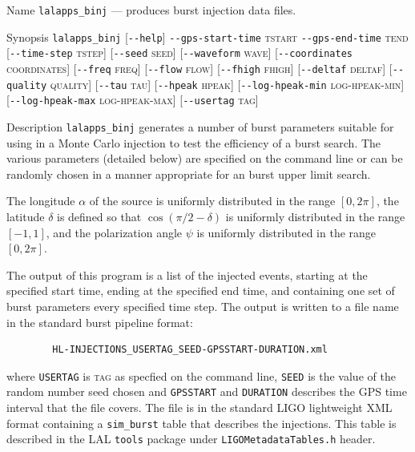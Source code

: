 \begin{entry}
\item[Name]
\verb$lalapps_binj$ --- produces burst injection data files.

\item[Synopsis]
\verb$lalapps_binj$ 
[\verb$--help$]
\verb$--gps-start-time$ \textsc{tstart} 
\verb$--gps-end-time$ \textsc{tend} 
[\verb$--time-step$ \textsc{tstep}]
[\verb$--seed$ \textsc{seed}]
[\verb$--waveform$ \textsc{wave}]
[\verb$--coordinates$ \textsc{coordinates}]
[\verb$--freq$ \textsc{freq}]
[\verb$--flow$ \textsc{flow}]
[\verb$--fhigh$ \textsc{fhigh}]
[\verb$--deltaf$ \textsc{deltaf}]
[\verb$--quality$ \textsc{quality}]
[\verb$--tau$ \textsc{tau}]
[\verb$--hpeak$ \textsc{hpeak}]
[\verb$--log-hpeak-min$ \textsc{log-hpeak-min}]
[\verb$--log-hpeak-max$ \textsc{log-hpeak-max}]
[\verb$--usertag$ \textsc{tag}]

\item[Description] 
\verb$lalapps_binj$
generates a number of burst  parameters suitable  for using in a Monte
Carlo injection to test the efficiency of a burst search.  The  various
parameters (detailed  below)  are specified on the command line or can be
randomly chosen in a manner appropriate for an burst upper limit
search.

The longitude $\alpha$ of the source is uniformly distributed in the
range $[0,2\pi]$, the latitude $\delta$ is defined so that $\cos(\pi/2 - 
\delta)$ is uniformly distributed in the range $[-1,1]$,  and the 
polarization angle $\psi$  is uniformly distributed in the
range $[0,2\pi]$.

The output of this program  is  a  list  of  the  injected events,  starting
at  the specified start time, ending at the specified end time, and containing
one set  of burst parameters every specified time step.  The output
is written to a file name in the standard burst pipeline format:
\begin{center}
\begin{verbatim}
        HL-INJECTIONS_USERTAG_SEED-GPSSTART-DURATION.xml
\end{verbatim}
\end{center}
where \verb$USERTAG$ is \textsc{tag} as specfied on the command line, 
\verb$SEED$ is the  value  of  the random number seed chosen and 
\verb$GPSSTART$ and \verb$DURATION$ describes the GPS time interval that
the file covers. The file is in the standard LIGO lightweight XML format
containing a \texttt{sim\_burst} table that describes the injections.
This table is described in the LAL \texttt{tools} package under
\texttt{LIGOMetadataTables.h} header.  


\end{entry}
